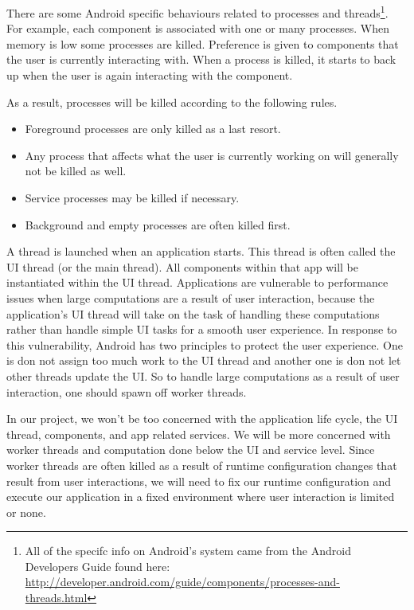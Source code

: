 \documentclass[11pt]{article}
\begin{document}
There are some Android specific behaviours related to processes and threads\footnote{All of the specifc info on Android’s system came from the Android Developers Guide found here: \url{http://developer.android.com/guide/components/processes-and-threads.html}}. For example, each component is associated with one or many processes.  When memory is low some processes are killed.  Preference is given to components that the user is currently interacting with.  When a process is killed, it starts to back up when the user is again interacting with the component.

As a result, processes will be killed according to the following rules.

\begin{itemize}
\item Foreground processes are only killed as a last resort.
\item Any process that affects what the user is currently working on will generally not be killed as well.
\item Service processes may be killed if necessary.
\item Background and empty processes are often killed first.
\end{itemize}

A thread is launched when an application starts.  This thread is often called the UI thread (or the main thread).  All components within that app will be instantiated within the UI thread.  Applications are vulnerable to performance issues when large computations are a result of user interaction, because the application’s UI thread will take on the task of handling these computations rather than handle simple UI tasks for a smooth user experience.  In response to this vulnerability, Android has two principles to protect the user experience.  One is don not assign too much work to the UI thread and another one is don not let other threads update the UI.  So to handle large computations as a result of user interaction, one should spawn off worker threads.

In our project, we won’t be too concerned with the application life cycle, the UI thread, components, and app related services.  We will be more concerned with worker threads and computation done below the UI and service level.  Since worker threads are often killed as a result of runtime configuration changes that result from user interactions, we will need to fix our runtime configuration and execute our application in a fixed environment where user interaction is limited or none.
\end{document}
